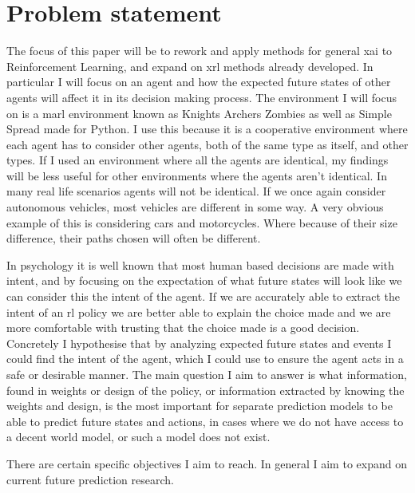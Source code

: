 \documentclass[UKenglish]{uiomasterthesis}
\begin{document}
\section{Problem statement}
\label{sec:problem}
The focus of this paper will be to rework and apply methods for general \ac{xai} to Reinforcement Learning, and expand on \ac{xrl} methods already developed. In particular I will focus on an agent and how the expected future states of other agents will affect it in its decision making process. The environment I will focus on is a \ac{marl} environment known as Knights Archers Zombies \cite{KAZ} as well as Simple Spread \cite{spread} made for Python. I use this because it is a cooperative environment where each agent has to consider other agents, both of the same type as itself, and other types. If I used an environment where all the agents are identical, my findings will be less useful for other environments where the agents aren't identical. In many real life scenarios agents will not be identical. If we once again consider autonomous vehicles, most vehicles are different in some way. A very obvious example of this is considering cars and motorcycles. Where because of their size difference, their paths chosen will often be different.

In psychology it is well known that most human based decisions are made with intent\cite{inbook}, and by focusing on the expectation of what future states will look like we can consider this the intent of the agent. If we are accurately able to extract the intent of an \ac{rl} policy we are better able to explain the choice made and we are more comfortable with trusting that the choice made is a good decision. Concretely I hypothesise that by analyzing expected future states and events I could find the intent of the agent, which I could use to ensure the agent acts in a safe or desirable manner. The main question I aim to answer is what information, found in weights or design of the policy, or information extracted by knowing the weights and design, is the most important for separate prediction models to be able to predict future states and actions, in cases where we do not have access to a decent world model, or such a model does not exist.

There are certain specific objectives I aim to reach. In general I aim to expand on current future prediction research.
\end{document}
